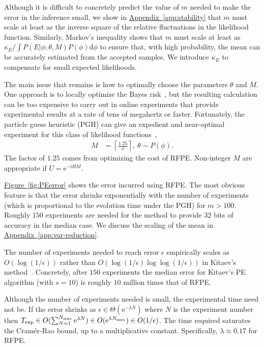 \documentclass[aps,pra,amsmath,twocolumn,amssymb,superscriptaddress]{revtex4-1}
\newcommand{\app}[1]{\hyperref[app:#1]{Appendix~\ref*{app:#1}}}
\newcommand{\fig}[1]{\hyperref[fig:#1]{Figure~\ref*{fig:#1}}}
\newcommand{\ii}{\mathrm{i}}
\newcommand{\ee}{\mathrm{e}}
\begin{document}
Although it is difficult to concretely predict the value of $m$ needed to make the error in the inference small, we show in \app{stability} that $m$ must scale at least as the inverse square of the relative fluctuations in the likelihood function.  Similarly, Markov's inequality shows that $m$ must scale at least as $\kappa_E/\int P(E|\phi;\theta,M)P(\phi) \mathrm{d}\phi$ to ensure that, with high probability, the mean can be accurately estimated from the accepted samples.  We introduce $\kappa_E$ to compensate for small expected likelihoods.

The main issue that remains is how to optimally choose the parameters $\theta$
and $M$. One approach is to locally optimize the Bayes
risk~\cite{granade_robust_2012}, but the resulting calculation can be too
expensive to carry out in online experiments that provide experimental results
at a rate of tens of megahertz or faster.  Fortunately, the particle guess heuristic (PGH) can give an
expedient and
near-optimal experiment for this class of likelihood
functions~\cite{wiebe_hamiltonian_2014},
\begin{align}
    M &= \left\lceil\frac{1.25}{\sigma}\right\rceil,~
    \theta \sim P(\phi).\label{eq:PGH}
\end{align}
The factor of $1.25$ comes from optimizing the cost of RFPE.   Non-integer $M$
are appropriate if $U=\ee^{-\ii H M}$.

\fig{PEerror} shows the error incurred using RFPE.  The most obvious feature is that the error shrinks exponentially with the number of experiments (which is proportional to the evolution time under the PGH) for $m>100$.  Roughly $150$ experiments are needed for the method to provide $32$ bits of accuracy in the median case.
We discuss the scaling of the mean in \app{var-reduction}.

The number of experiments needed to reach error $\epsilon$ empirically scales as $O(\log(1/\epsilon))$ rather than $O(\log(1/\epsilon)\log\log(1/\epsilon))$ in Kitaev's method~\cite{Kit96,kitaev2002classical}.  Concretely, after $150$ experiments the median error for Kitaev's PE algorithm (with $s=10$) is roughly $10$ million times that of RFPE.

Although the number of experiments needed is small, the experimental time need
not be.  If the error shrinks as $\epsilon\in \Theta(\ee^{-\lambda N})$ where
$N$ is the experiment number then $T_{\exp}\in O(\sum_{N=1}^{N_{\max}} \ee^{\lambda N})\in O(\ee^{\lambda N_{\rm max}})\in O(1/\epsilon)$.  The
time required saturates the Cram\'er-Rao bound, up to a multiplicative constant.
Specifically, $\lambda\approx 0.17$ for RFPE.
\end{document}
